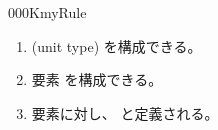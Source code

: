 \documentclass[index]{subfiles}
\begin{document}
\begin{myBlock}{000K}{myRule}
  \begin{enumerate}
  \item {}(unit type)
    \myInlineMath{\myUnitType \myElemOf \myUniverse{\myLevelZero}}
    を構成できる。
  \item 要素\myInlineMath{\myUnitElem \myElemOf \myUnitType}
    を構成できる。
  \item 要素に対し、
    と定義される。
  \end{enumerate}
\end{myBlock}
\end{document}
